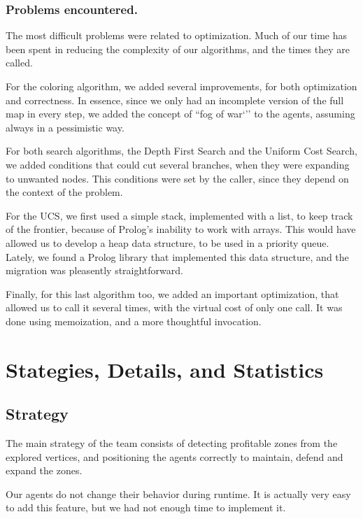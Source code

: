 \documentclass{llncs2e/llncs}
\begin{document}
\subsubsection{Problems encountered.}

    The most difficult problems were related to optimization. Much of our time has 
    been spent in reducing the complexity of our algorithms, and the times they 
    are called.

    For the coloring algorithm, we added several improvements, for both 
    optimization and correctness. In essence, since we only had an incomplete 
    version of the full map in every step, we added the concept of ``fog of war`'' 
    to the agents, assuming always in a pessimistic way. 

    For both search algorithms, the Depth First Search and the Uniform Cost 
    Search, we added conditions that could cut several branches, when they were 
    expanding to unwanted nodes. This conditions were set by the caller, since 
    they depend on the context of the problem.

    For the UCS, we first used a simple stack, implemented with a list, to keep 
    track of the frontier, because of Prolog's inability to work with arrays. This 
    would have allowed us to develop a heap data structure, to be used in a 
    priority queue. Lately, we found a Prolog library that implemented this data 
    structure, and the migration was pleasently straightforward.

    Finally, for this last algorithm too, we added an important optimization, 
    that allowed us to call it several times, with the virtual cost of only one 
    call. It was done using memoization, and a more thoughtful invocation.

\section{Stategies, Details, and Statistics}

\subsection{Strategy}
    The main strategy of the team consists of detecting profitable zones from the 
    explored vertices, and positioning the agents correctly to maintain, defend 
    and expand the zones. 
    
    Our agents do not change their behavior during runtime. It is actually very 
    easy to add this feature, but we had not enough time to implement it.
    
\end{document}
